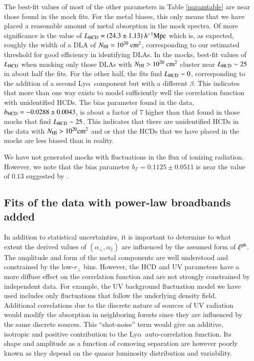 \documentclass{aa}
\newcommand{\xicosmo}{\xi^{\rm ph}}
\newcommand{\apar}{\alpha_\parallel}
\newcommand{\aperp}{\alpha_\perp}
\newcommand{\hMpc}{h^{-1}{\rm Mpc}}
\newcommand{\Lya}{Ly$\alpha$~}
\newcommand{\rperp}{r_\perp}
\newcommand{\bhcds}{b_{\rm HCD}}
\newcommand{\Lhcds}{L_{\rm HCD}}
\newcommand{\NHI}{N_{\rm HI}}
\begin{document}
The best-fit values of most of the other parameters
in Table \ref{paramtable} are near those found in the mock fits.
For the metal biases, this only means that we have placed a reasonable
amount of metal absorption in the mock spectra.
Of more significance is 
the value of $\Lhcds=(24.3\pm1.13)~\hMpc$ which is, as expected, roughly the
width of a DLA of $\NHI=10^{20}~{\rm cm^2}$, corresponding
to our estimated threshold for good efficiency
in identifying DLAs.  In the mocks, best-fit values
of $\Lhcds$ when masking only those DLAs with $\NHI>10^{20}~{\rm cm^2}$
cluster near $\Lhcds\sim25$ in about half the fits.
For the other half, the fits find $\Lhcds\sim0$, corresponding to the
addition of a second \Lya component but with a different $\beta$.
This indicates that more than one way exists to model
sufficiently well the correlation
function with unidentified HCDs.
The bias parameter found in the data, $\bhcds=-0.0288\pm0.0043$,
is about a factor of 7 higher than that found in those mocks
that find $\Lhcds\sim25$.  This indicates that
there are unidentified HCDs in the data with $\NHI>10^{20}{\rm cm^2}$
 and or that the HCDs that
 we have placed in the mocks are less biased than in reality.

 We have not generated mocks with fluctuations in the flux of
 ionizing radiation.  However,
 we note that the bias parameter $b_\Gamma=0.1125\pm0.0511$ is near
 the value of $0.13$ suggested by \citet{2014MNRAS.442..187G}.


\subsection{Fits of the data with power-law broadbands added}



In addition to statistical uncertainties,
it is important to determine to what extent
the derived values of $(\aperp,\apar)$
are influenced by the assumed form of $\xicosmo$.
The amplitude and form of the metal
components are well understood and  constrained by
the low-$\rperp$ bins.
However,
the HCD and UV parameters 
have a more diffuse effect on the correlation
function and are not strongly constrained by
independent data.
For example, 
the UV background fluctuation model
we have used includes only fluctuations that follow the
underlying density field.
Additional correlations \citep{2014MNRAS.442..187G}
due to the discrete nature of sources of UV radiation
would modify the absorption
in neighboring forests since they are influenced by the same
discrete sources.
This ``shot-noise''
term would give an additive, isotropic and positive contribution
to the \Lya auto-correlation function.
Its shape and amplitude as a function of comoving separation are
however poorly known as they depend on the quasar luminosity distribution
and variability.
\end{document}
